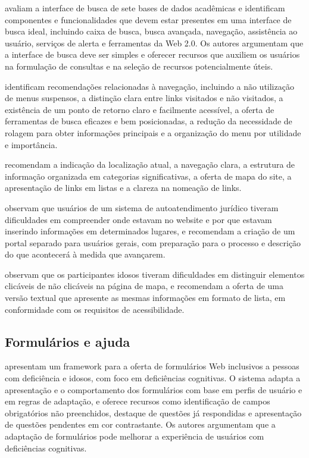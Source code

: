 \label{sec:busca}

\cite{shafiq2018assessment} avaliam a interface de busca de sete bases de dados acadêmicas e identificam componentes e funcionalidades que devem estar presentes em uma interface de busca ideal, incluindo caixa de busca, busca avançada, navegação, assistência ao usuário, serviços de alerta e ferramentas da Web 2.0. Os autores argumentam que a interface de busca deve ser simples e oferecer recursos que auxiliem os usuários na formulação de consultas e na seleção de recursos potencialmente úteis.

\cite{dombrovskaia2021guideline} identificam recomendações relacionadas à navegação, incluindo a não utilização de menus suspensos, a distinção clara entre links visitados e não visitados, a existência de um ponto de retorno claro e facilmente acessível, a oferta de ferramentas de busca eficazes e bem posicionadas, a redução da necessidade de rolagem para obter informações principais e a organização do menu por utilidade e importância.

\cite{sun2010preliminary} recomendam a indicação da localização atual, a navegação clara, a estrutura de informação organizada em categorias significativas, a oferta de mapa do site, a apresentação de links em listas e a clareza na nomeação de links.

\cite{mastarone2007access} observam que usuários de um sistema de autoatendimento jurídico tiveram dificuldades em compreender onde estavam no website e por que estavam inserindo informações em determinados lugares, e recomendam a criação de um portal separado para usuários gerais, com preparação para o processo e descrição do que acontecerá à medida que avançarem.

\cite{xie2010usability} observam que os participantes idosos tiveram dificuldades em distinguir elementos clicáveis de não clicáveis na página de mapa, e recomendam a oferta de uma versão textual que apresente as mesmas informações em formato de lista, em conformidade com os requisitos de acessibilidade.

\subsection{Formulários e ajuda}

\label{sec:formularios}

\cite{halbach2009framework} apresentam um framework para a oferta de formulários Web inclusivos a pessoas com deficiência e idosos, com foco em deficiências cognitivas. O sistema adapta a apresentação e o comportamento dos formulários com base em perfis de usuário e em regras de adaptação, e oferece recursos como identificação de campos obrigatórios não preenchidos, destaque de questões já respondidas e apresentação de questões pendentes em cor contrastante. Os autores argumentam que a adaptação de formulários pode melhorar a experiência de usuários com deficiências cognitivas.

